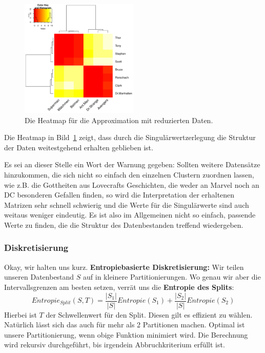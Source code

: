 \begin{figure}[!th]
	\center
	\includegraphics[width=0.5\textwidth]{Figures/reduced_data}
	\caption{Die Heatmap für die Approximation mit reduzierten Daten.}
	\label{fig:reduced_data}
\end{figure}

Die Heatmap in Bild~\ref{fig:reduced_data} zeigt, dass durch die Singulärwertzerlegung
die Struktur der Daten weitestgehend erhalten geblieben ist.

Es sei an dieser Stelle ein Wort der Warnung gegeben: Sollten weitere Datensätze
hinzukommen, die sich nicht so einfach den einzelnen Clustern zuordnen lassen,
wie z.B. die Gottheiten aus Lovecrafts Geschichten, die weder an Marvel noch an DC
besonderen Gefallen finden, so wird die Interpretation der erhaltenen Matrizen
sehr schnell schwierig und die Werte für die Singulärwerte sind auch weitaus weniger
eindeutig. Es ist also im Allgemeinen nicht so einfach, passende Werte zu finden,
die die Struktur des Datenbestanden treffend wiedergeben.

\subsubsection{Diskretisierung}
Okay, wir halten uns kurz.  \textbf{Entropiebasierte Diskretisierung:} Wir teilen
unseren Datenbestand \(S\) auf in kleinere Partitionierungen. Wo genau wir aber
die Intervallsgrenzen am besten setzen, verrät uns die \textbf{Entropie des Splits}:
\[
	Entropie_{Split}(S,T) = \frac{|S_1|}{|S|} Entropie(S_1) +
	\frac{|S_2|}{|S|} Entropie(S_2)
\]
Hierbei ist \(T\) der Schwellenwert für den Split. Diesen gilt es effizient zu wählen.
Natürlich lässt sich das auch für mehr als 2 Partitionen machen. Optimal ist unsere
Partitionierung, wenn obige Funktion minimiert wird. Die Berechnung wird rekursiv
durchgeführt, bis irgendein Abbruchkriterium erfüllt ist.


